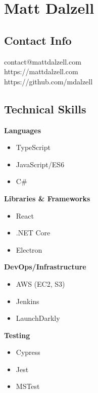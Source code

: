 \documentclass[12pt]{article}
\begin{document}

\section*{Matt Dalzell}

\setlength{\columnsep}{4em}
\setlength{\columnseprule}{0.1pt}
\begin{paracol}{2}

\subsection*{Contact Info}
contact@mattdalzell.com \\ 
https://mattdalzell.com \\
https://github.com/mdalzell 

\subsection*{Technical Skills} 

\textbf{Languages}
\begin{itemize}
    \item TypeScript 
    \item JavaScript/ES6
    \item C\#
\end{itemize}

\noindent \textbf{Libraries \& Frameworks}
\begin{itemize}
    \item React 
    \item .NET Core
    \item Electron
\end{itemize}

\noindent \textbf{DevOps/Infrastructure}
\begin{itemize}
    \item AWS (EC2, S3)
    \item Jenkins
    \item LaunchDarkly
\end{itemize}

\noindent \textbf{Testing}
\begin{itemize}
    \item Cypress
    \item Jest
    \item MSTest
\end{itemize}


\end{paracol}
\end{document}
